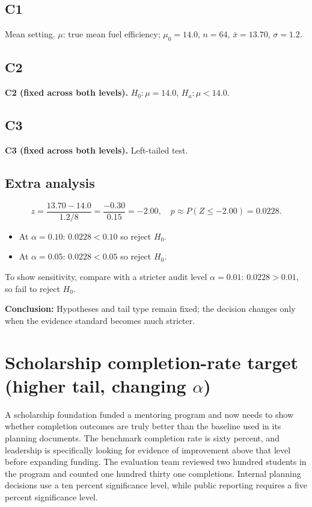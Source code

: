 \subsection*{C1}
Mean setting. \(\mu\): true mean fuel efficiency; \(\mu_0=14.0\), \(n=64\), \(\bar{x}=13.70\), \(\sigma=1.2\).

\subsection*{C2}
\textbf{C2 (fixed across both levels).} \(H_0:\mu=14.0\), \(H_a:\mu<14.0\).

\subsection*{C3}
\textbf{C3 (fixed across both levels).} Left-tailed test. \LeftTailGraph

\subsection*{Extra analysis}
\[
z=\frac{13.70-14.0}{1.2/8}=\frac{-0.30}{0.15}=-2.00,
\quad p\approx P(Z\le -2.00)=0.0228.
\]
\begin{itemize}
\item At \(\alpha=0.10\): \(0.0228<0.10\) so reject \(H_0\).
\item At \(\alpha=0.05\): \(0.0228<0.05\) so reject \(H_0\).
\end{itemize}
To show sensitivity, compare with a stricter audit level \(\alpha=0.01\): \(0.0228>0.01\), so fail to reject \(H_0\).

\textbf{Conclusion:} Hypotheses and tail type remain fixed; the decision changes only when the evidence standard becomes much stricter.


\section{Scholarship completion-rate target (higher tail, changing \(\alpha\))}
A scholarship foundation funded a mentoring program and now needs to show whether completion outcomes are truly better than the baseline used in its planning documents. The benchmark completion rate is sixty percent, and leadership is specifically looking for evidence of improvement above that level before expanding funding. The evaluation team reviewed two hundred students in the program and counted one hundred thirty one completions. Internal planning decisions use a ten percent significance level, while public reporting requires a five percent significance level.

